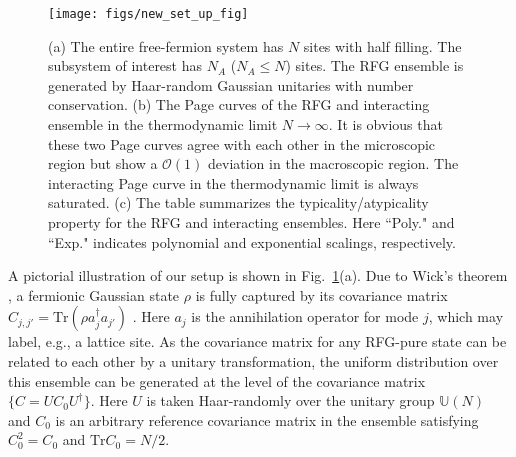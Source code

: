 \documentclass[twocolumn,english,prl,aps,superscriptaddress,amsmath,amssymb,floatfix]{revtex4-2}
\def \Tr {\mathrm{Tr}}
\begin{document}
\begin{figure}
\texttt{[image: figs/new\_set\_up\_fig]}\caption{(a) The entire %
free-fermion system has $N$ sites with half filling. The %
subsystem of interest %
has $N_{A}$ ($N_{A}\le%
N$) sites. %
The RFG ensemble is generated by Haar-random Gaussian unitaries with number conservation. %
(b) %
The Page curves of the RFG %
and interacting ensemble in the thermodynamic limit $N\to\infty$. %
It is obvious that these two Page curves agree with each other in the microscopic region but show a $\mathcal{O}(1)$ deviation in the macroscopic region. The interacting Page curve in the thermodynamic limit is always saturated. (c) The table summarizes the typicality/atypicality property for the RFG and interacting ensembles. Here ``Poly." and ``Exp." indicates polynomial and exponential scalings, respectively.}
\label{Setup_of_CCRFG_ensemble}
\end{figure}

A pictorial illustration of our setup is shown %
in Fig.~\ref{Setup_of_CCRFG_ensemble}(a). 
Due to Wick's theorem \citep{Hackl2021}, a fermionic Gaussian %
state $\rho$ is %
fully captured %
by its covariance matrix $C_{j,j'}=\mathrm{Tr}(\rho a_{j}^{\dagger}a_{j'})$ \cite{Peschel2003}.
Here $a_{j}$ is the annihilation operator for mode $j$, which may label, e.g., a lattice site. %
As the covariance matrix for any RFG-pure state can be related to each
other by a unitary transformation, %
the uniform distribution over this ensemble can be generated at the
level of the covariance matrix $\{C=UC_{0}U^{\dagger}\}$. Here %
$U$ is taken Haar-randomly over the unitary group $\mathbb{U}(N)$ %
\citep{Bianchi2021,Bianchi2021a} and
$C_{0}$ is an arbitrary reference %
covariance matrix in the ensemble satisfying $C_0^2=C_0$ and $\Tr C_0=N/2$. %
\end{document}
